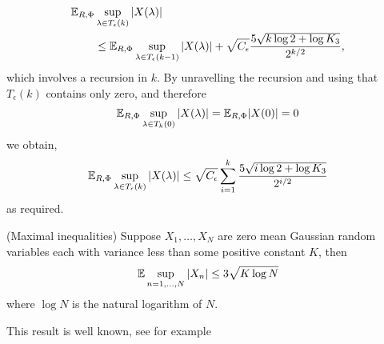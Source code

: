 \documentclass[journal]{IEEEtran}
\begin{document}
\begin{IEEEproof}
\begin{align*}
{\mathbb E}_{R,\Phi}&\sup_{\lambda \in T_\epsilon(k)}{\vert X(\lambda) \vert} \\
&\leq {\mathbb E}_{R,\Phi}\sup_{\lambda \in T_\epsilon(k-1)}{\vert X(\lambda) \vert} + \sqrt{C_\epsilon} \frac{5\sqrt{k \log 2 + \log K_3}}{2^{k/2}} ,
\end{align*}
which involves a recursion in $k$.  By unravelling the recursion and using that $T_\epsilon(k)$ contains only zero, and therefore
\[
{\mathbb E}_{R,\Phi} \sup_{\lambda \in T_k(0)} {\vert X(\lambda) \vert} = {\mathbb E}_{R,\Phi} {\vert X(0) \vert} = 0
\]
we obtain,
\[
{\mathbb E}_{R,\Phi}\sup_{\lambda \in T_\epsilon(k)}{\vert X(\lambda) \vert} \leq  \sqrt{C_\epsilon} \sum_{i=1}^k \frac{5\sqrt{i \log 2 + \log K_3}}{2^{i/2}}  
\]
as required.
\end{IEEEproof}

\begin{lemma}\label{lem:maxineq}(Maximal inequalities)
Suppose $X_1, \dots, X_N$ are zero mean Gaussian random variables each with variance less than some positive constant $K$, then
\[
{\mathbb E} \sup_{n = 1, \dots, N} {\left\vert X_n \right\vert} \leq 3  \sqrt{K \log N}
\]
where $\log N$ is the natural logarithm of $N$.
\end{lemma}
\begin{IEEEproof}
This result is well known, see for example~\cite[Section~3]{Pollard_asymp_empi_proc_1989}  
\end{IEEEproof}
\end{document}
